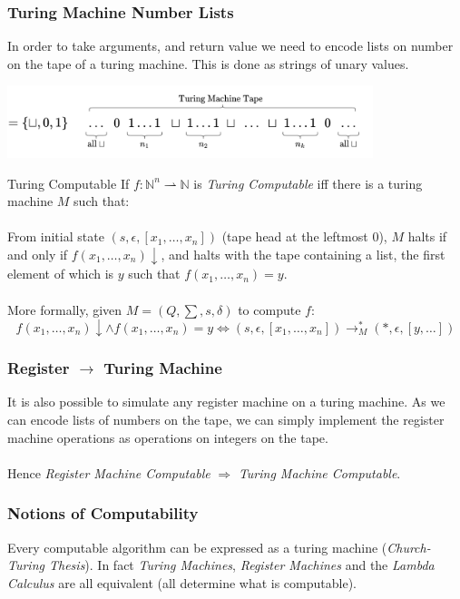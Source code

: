 \subsubsection{Turing Machine Number Lists}
In order to take arguments, and return value we need to encode lists on number on the tape of a turing machine. This is done as strings of unary values.
\begin{center}
    \includegraphics[width=0.8\textwidth]{turing_machines/images/turing_tape_list.drawio.png}
\end{center}
\begin{definitionbox}{Turing Computable}
	If $f: \mathbb{N}^n  \rightharpoonup \mathbb{N}$ is \textit{Turing Computable} iff there is a turing machine $M$ such that:
	\\
	\\ From initial state $(s, \epsilon, [x_1, \dots, x_n])$ (tape head at the leftmost $0$), $M$ halts if and only if $f(x_1, \dots, x_n)\downarrow$, and halts with the tape containing a list, the first element of which is $y$ such that $f(x_1, \dots, x_n) = y$.
	\\
	\\ More formally, given $M = (Q, \sum, s, \delta)$ to compute $f$:
	\[f(x_1, \dots, x_n)\downarrow \land f(x_1, \dots, x_n)=y \Leftrightarrow(s,\epsilon, [x_1, \dots, x_n]) \to^*_M (*, \epsilon, [y, \dots])\]
\end{definitionbox}

\subsubsection{Register $\to$ Turing Machine}
It is also possible to simulate any register machine on a turing machine. As we can encode lists of numbers on the tape, we can simply implement the register machine operations as operations on integers on the tape.
\\
\\ Hence \textit{Register Machine Computable} $\Rightarrow$ \textit{Turing Machine Computable}.

\subsubsection{Notions of Computability}
Every computable algorithm can be expressed as a turing machine (\textit{Church-Turing Thesis}). In fact \textit{Turing Machines}, \textit{Register Machines} and the \textit{Lambda Calculus} are all equivalent (all determine what is computable).


